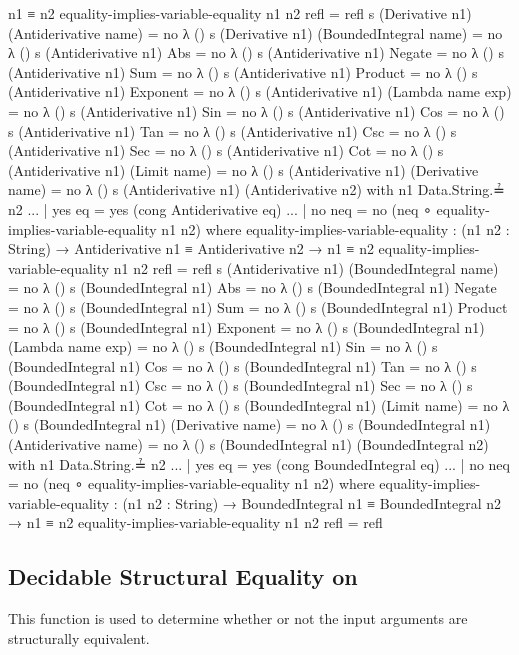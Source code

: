 \documentclass{report}
\begin{document}
\begin{code}
           n1 ≡ n2
    equality-implies-variable-equality n1 n2 refl = refl
  s (Derivative n1) (Antiderivative name) = no λ ()
  s (Derivative n1) (BoundedIntegral name) = no λ ()
  s (Antiderivative n1) Abs = no λ ()
  s (Antiderivative n1) Negate = no λ ()
  s (Antiderivative n1) Sum = no λ ()
  s (Antiderivative n1) Product = no λ ()
  s (Antiderivative n1) Exponent = no λ ()
  s (Antiderivative n1) (Lambda name exp) = no λ ()
  s (Antiderivative n1) Sin = no λ ()
  s (Antiderivative n1) Cos = no λ ()
  s (Antiderivative n1) Tan = no λ ()
  s (Antiderivative n1) Csc = no λ ()
  s (Antiderivative n1) Sec = no λ ()
  s (Antiderivative n1) Cot = no λ ()
  s (Antiderivative n1) (Limit name) = no λ ()
  s (Antiderivative n1) (Derivative name) = no λ ()
  s (Antiderivative n1) (Antiderivative n2) with n1 Data.String.≟ n2
  ... | yes eq = yes (cong Antiderivative eq)
  ... | no neq = no (neq ∘ equality-implies-variable-equality n1 n2)
    where
    equality-implies-variable-equality : (n1 n2 : String) →
           Antiderivative n1 ≡ Antiderivative n2 →
           n1 ≡ n2
    equality-implies-variable-equality n1 n2 refl = refl
  s (Antiderivative n1) (BoundedIntegral name) = no λ ()
  s (BoundedIntegral n1) Abs = no λ ()
  s (BoundedIntegral n1) Negate = no λ ()
  s (BoundedIntegral n1) Sum = no λ ()
  s (BoundedIntegral n1) Product = no λ ()
  s (BoundedIntegral n1) Exponent = no λ ()
  s (BoundedIntegral n1) (Lambda name exp) = no λ ()
  s (BoundedIntegral n1) Sin = no λ ()
  s (BoundedIntegral n1) Cos = no λ ()
  s (BoundedIntegral n1) Tan = no λ ()
  s (BoundedIntegral n1) Csc = no λ ()
  s (BoundedIntegral n1) Sec = no λ ()
  s (BoundedIntegral n1) Cot = no λ ()
  s (BoundedIntegral n1) (Limit name) = no λ ()
  s (BoundedIntegral n1) (Derivative name) = no λ ()
  s (BoundedIntegral n1) (Antiderivative name) = no λ ()
  s (BoundedIntegral n1) (BoundedIntegral n2) with n1 Data.String.≟ n2
  ... | yes eq = yes (cong BoundedIntegral eq)
  ... | no neq = no (neq ∘ equality-implies-variable-equality n1 n2)
    where
    equality-implies-variable-equality : (n1 n2 : String) →
           BoundedIntegral n1 ≡ BoundedIntegral n2 →
           n1 ≡ n2
    equality-implies-variable-equality n1 n2 refl = refl
\end{code}

\subsection{Decidable Structural Equality on }
This function is used to determine whether or not the input arguments are structurally equivalent.
\end{document}

